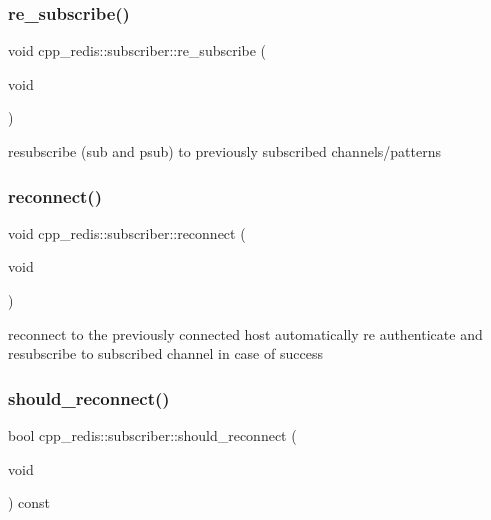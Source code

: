 \subsubsection{\texorpdfstring{re\+\_\+subscribe()}{re\_subscribe()}}
{\footnotesize\ttfamily void cpp\+\_\+redis\+::subscriber\+::re\+\_\+subscribe (\begin{DoxyParamCaption}\item[{void}]{ }\end{DoxyParamCaption})\hspace{0.3cm}{\ttfamily [private]}}

resubscribe (sub and psub) to previously subscribed channels/patterns \mbox{\label{classcpp__redis_1_1subscriber_a0d5c27ee74e5422d07ce14677ae0e23b}} 
\subsubsection{\texorpdfstring{reconnect()}{reconnect()}}
{\footnotesize\ttfamily void cpp\+\_\+redis\+::subscriber\+::reconnect (\begin{DoxyParamCaption}\item[{void}]{ }\end{DoxyParamCaption})\hspace{0.3cm}{\ttfamily [private]}}

reconnect to the previously connected host automatically re authenticate and resubscribe to subscribed channel in case of success \mbox{\label{classcpp__redis_1_1subscriber_a87b9daaeed9872a0bc65438729b1211e}} 
\subsubsection{\texorpdfstring{should\+\_\+reconnect()}{should\_reconnect()}}
{\footnotesize\ttfamily bool cpp\+\_\+redis\+::subscriber\+::should\+\_\+reconnect (\begin{DoxyParamCaption}\item[{void}]{ }\end{DoxyParamCaption}) const\hspace{0.3cm}{\ttfamily [private]}}

